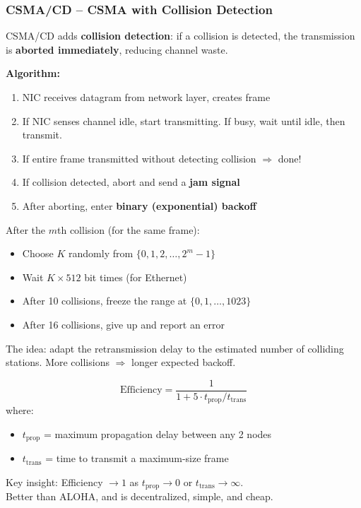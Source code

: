 \subsubsection{CSMA/CD -- CSMA with Collision Detection}

\begin{keybox}
CSMA/CD adds \textbf{collision detection}: if a collision is detected, the transmission is \textbf{aborted immediately}, reducing channel waste.

\textbf{Algorithm:}
\begin{enumerate}[noitemsep]
    \item NIC receives datagram from network layer, creates frame
    \item If NIC senses channel idle, start transmitting. If busy, wait until idle, then transmit.
    \item If entire frame transmitted without detecting collision $\Rightarrow$ done!
    \item If collision detected, abort and send a \textbf{jam signal}
    \item After aborting, enter \textbf{binary (exponential) backoff}
\end{enumerate}
\end{keybox}

\begin{formulabox}
After the $m$th collision (for the same frame):
\begin{itemize}[noitemsep]
    \item Choose $K$ randomly from $\{0, 1, 2, \ldots, 2^m - 1\}$
    \item Wait $K \times 512$ bit times (for Ethernet)
    \item After 10 collisions, freeze the range at $\{0, 1, \ldots, 1023\}$
    \item After 16 collisions, give up and report an error
\end{itemize}

The idea: adapt the retransmission delay to the estimated number of colliding stations. More collisions $\Rightarrow$ longer expected backoff.
\end{formulabox}

\begin{imagebox}
\end{imagebox}

\begin{formulabox}
\[
\text{Efficiency} = \frac{1}{1 + 5 \cdot t_{\text{prop}} / t_{\text{trans}}}
\]
where:
\begin{itemize}[noitemsep]
    \item $t_{\text{prop}}$ = maximum propagation delay between any 2 nodes
    \item $t_{\text{trans}}$ = time to transmit a maximum-size frame
\end{itemize}

\medskip
Key insight: Efficiency $\to 1$ as $t_{\text{prop}} \to 0$ or $t_{\text{trans}} \to \infty$.\\
Better than ALOHA, and is decentralized, simple, and cheap.
\end{formulabox}

